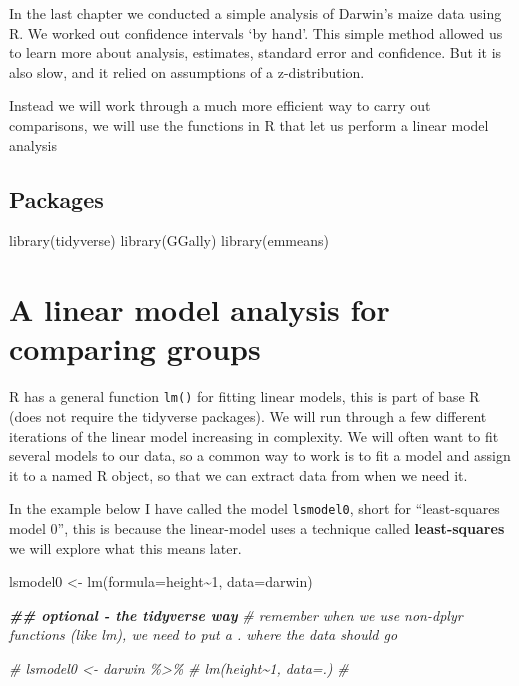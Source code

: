 \documentclass[
]{book}
\newenvironment{Shaded}{\begin{snugshade}}{\end{snugshade}}
\newcommand{\AttributeTok}[1]{\textcolor[rgb]{0.77,0.63,0.00}{#1}}
\newcommand{\CommentTok}[1]{\textcolor[rgb]{0.56,0.35,0.01}{\textit{#1}}}
\newcommand{\DecValTok}[1]{\textcolor[rgb]{0.00,0.00,0.81}{#1}}
\newcommand{\DocumentationTok}[1]{\textcolor[rgb]{0.56,0.35,0.01}{\textbf{\textit{#1}}}}
\newcommand{\FunctionTok}[1]{\textcolor[rgb]{0.00,0.00,0.00}{#1}}
\newcommand{\NormalTok}[1]{#1}
\newcommand{\OtherTok}[1]{\textcolor[rgb]{0.56,0.35,0.01}{#1}}
\newcommand{\SpecialCharTok}[1]{\textcolor[rgb]{0.00,0.00,0.00}{#1}}
\begin{document}
In the last chapter we conducted a simple analysis of Darwin's maize data using R. We worked out confidence intervals `by hand'. This simple method allowed us to learn more about analysis, estimates, standard error and confidence. But it is also slow, and it relied on assumptions of a z-distribution.

Instead we will work through a much more efficient way to carry out comparisons, we will use the functions in R that let us perform a linear model analysis

\hypertarget{packages-1}{%
\subsection{Packages}\label{packages-1}}

\begin{Shaded}
\begin{Highlighting}[]
\FunctionTok{library}\NormalTok{(tidyverse)}
\FunctionTok{library}\NormalTok{(GGally)}
\FunctionTok{library}\NormalTok{(emmeans)}
\end{Highlighting}
\end{Shaded}

\hypertarget{a-linear-model-analysis-for-comparing-groups}{%
\section{A linear model analysis for comparing groups}\label{a-linear-model-analysis-for-comparing-groups}}

R has a general function \texttt{lm()} for fitting linear models, this is part of base R (does not require the tidyverse packages). We will run through a few different iterations of the linear model increasing in complexity. We will often want to fit several models to our data, so a common way to work is to fit a model and assign it to a named R object, so that we can extract data from when we need it.

In the example below I have called the model \texttt{lsmodel0}, short for ``least-squares model 0'', this is because the linear-model uses a technique called \textbf{least-squares} we will explore what this means later.

\begin{Shaded}
\begin{Highlighting}[]
\NormalTok{lsmodel0 }\OtherTok{\textless{}{-}} \FunctionTok{lm}\NormalTok{(}\AttributeTok{formula=}\NormalTok{height}\SpecialCharTok{\textasciitilde{}}\DecValTok{1}\NormalTok{, }\AttributeTok{data=}\NormalTok{darwin)}

\DocumentationTok{\#\# optional {-} the tidyverse way}
\CommentTok{\# remember when we use non{-}dplyr functions (like lm), we need to put a . where the data should go}

\CommentTok{\# lsmodel0 \textless{}{-} darwin \%\textgreater{}\% }
\CommentTok{\#             lm(height\textasciitilde{}1, data=.)}
\CommentTok{\# }
\end{Highlighting}
\end{Shaded}
\end{document}
